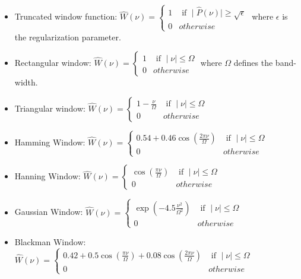{\small
\begin{itemize}
\itemsep=1truecm
\baselineskip=0.4truecm
\item Truncated window function:
$
\hat{W}(\nu) =  \left\{
  \begin{array}{ll}
    1   &  \mbox{ if }  \mid \hat{P}(\nu) \mid \ge \sqrt{\epsilon}    \\
    0   &   otherwise
  \end{array}
  \right.
$
where $\epsilon$ is the regularization parameter.
\item Rectangular window:
$
\hat{W}(\nu) =  \left\{
  \begin{array}{ll}
    1   &  \mbox{ if }  \mid  \nu \mid \le \Omega    \\
    0   &   otherwise
  \end{array}
  \right.
$
where $\Omega$ defines the band-width.
\item Triangular window:
$
\hat{W}(\nu) =  \left\{
  \begin{array}{ll}
    1 - \frac{\nu}{\Omega}  &  \mbox{ if }  \mid  \nu \mid \le \Omega    \\
    0   &   otherwise
  \end{array}
  \right.
$
\item Hamming Window:
$
\hat{W}(\nu) =  \left\{
  \begin{array}{ll}
    0.54 + 0.46 \cos(\frac{2\pi \nu}{\Omega})    &  \mbox{ if }  \mid  \nu \mid \le \Omega    \\
    0   &   otherwise
  \end{array}
  \right.
$

\item Hanning Window:
$
\hat{W}(\nu) =  \left\{
  \begin{array}{ll}
    \cos(\frac{\pi \nu}{\Omega})    &  \mbox{ if }  \mid  \nu \mid \le \Omega    \\
    0   &   otherwise
  \end{array}
  \right.
$

\item Gaussian Window:
$
\hat{W}(\nu) =  \left\{
  \begin{array}{ll}
     \exp(-4.5 \frac{\nu^2}{\Omega^2})    &  \mbox{ if }  \mid  \nu \mid \le \Omega    \\
    0   &   otherwise
  \end{array}
  \right.
$

\item Blackman Window:
$
\hat{W}(\nu) =  \left\{
  \begin{array}{ll}
  0.42 + 0.5  \cos(\frac{\pi \nu}{\Omega}) +  0.08  \cos(\frac{2\pi \nu}{\Omega})  &  \mbox{ if }  \mid  \nu \mid \le \Omega    \\
    0   &   otherwise
  \end{array}
  \right.
$
\end{itemize}
 }
 
